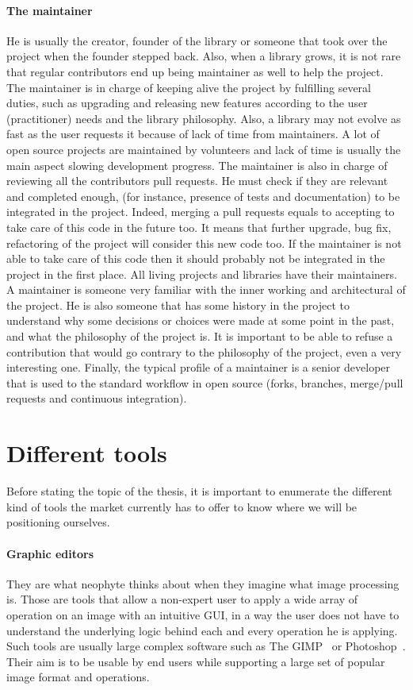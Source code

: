 \paragraph{The maintainer} He is usually the creator, founder of the library or someone that took over the project when
the founder stepped back. Also, when a library grows, it is not rare that regular contributors end up being maintainer
as well to help the project. The maintainer is in charge of keeping alive the project by fulfilling several duties, such
as upgrading and releasing new features according to the user (practitioner) needs and the library philosophy. Also, a
library may not evolve as fast as the user requests it because of lack of time from maintainers. A lot of open source
projects are maintained by volunteers and lack of time is usually the main aspect slowing development progress. The
maintainer is also in charge of reviewing all the contributors pull requests. He must check if they are relevant and
completed enough, (for instance, presence of tests and documentation) to be integrated in the project. Indeed, merging a
pull requests equals to accepting to take care of this code in the future too. It means that further upgrade, bug fix,
refactoring of the project will consider this new code too. If the maintainer is not able to take care of this code then
it should probably not be integrated in the project in the first place. All living projects and libraries have their
maintainers. A maintainer is someone very familiar with the inner working and architectural of the project. He is also
someone that has some history in the project to understand why some decisions or choices were made at some point in the
past, and what the philosophy of the project is. It is important to be able to refuse a contribution that would go
contrary to the philosophy of the project, even a very interesting one. Finally, the typical profile of a maintainer is
a senior developer that is used to the standard workflow in open source (forks, branches, merge/pull requests and
continuous integration).

\section*{Different tools}

Before stating the topic of the thesis, it is important to enumerate the different kind of tools the market currently
has to offer to know where we will be positioning ourselves.

\paragraph{Graphic editors} They are what neophyte thinks about when they imagine what image processing is. Those are
tools that allow a non-expert user to apply a wide array of operation on an image with an intuitive GUI, in a way the
user does not have to understand the underlying logic behind each and every operation he is applying. Such tools are
usually large complex software such as The GIMP~\parencite{gimp.2019} or Photoshop~\parencite{adobe.2019.photoshop}.
Their aim is to be usable by end users while supporting a large set of popular image format and operations.

